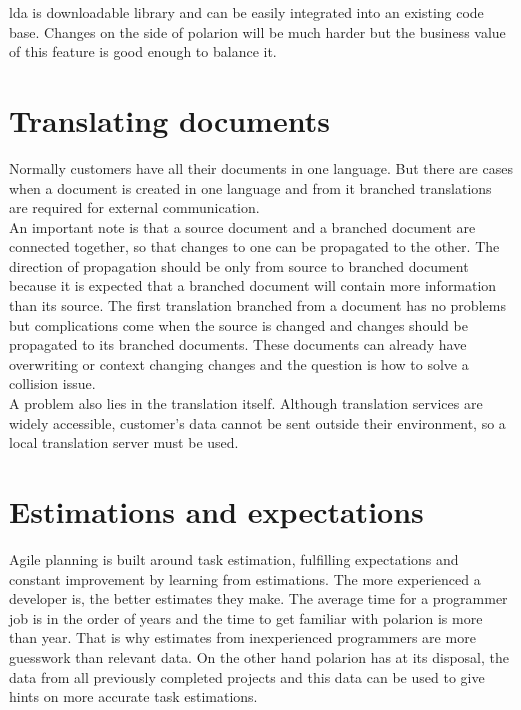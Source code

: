 \documentclass[thesis=M,english]{FITthesis}[2012/06/26]
\begin{document}
\acrshort{lda} is downloadable library and can be easily integrated into an existing code base. Changes on the side of \acrshort{polarion} will be much harder but the business value of this feature is good enough to balance it.

\section{Translating documents}

Normally customers have all their documents in one language. But there are cases when a document is created in one language and from it branched translations are required for external communication.\\

An important note is that a source document and a branched document are connected together, so that changes to one can be propagated to the other. The direction of propagation should be only from source to branched document because it is expected that a branched document will contain more information than its source. The first translation branched from a document has no problems but complications come when the source is changed and changes should be propagated to its branched documents. These documents can already have overwriting or context changing changes and the question is how to solve a collision issue. \\

A problem also lies in the translation itself. Although translation services are widely accessible, customer's data cannot be sent outside their environment, so a local translation server must be used.

\section{Estimations and expectations}

Agile planning is built around task estimation, fulfilling expectations and constant improvement by learning from estimations. The more experienced a developer is, the better estimates they make. The average time for a programmer job is in the order of years and the time to get familiar with \acrshort{polarion} is more than year. That is why estimates from inexperienced programmers are more guesswork  than relevant data. On the other hand \acrshort{polarion} has at its disposal, the data from all previously completed projects and this data can be used to give hints on more accurate task estimations.\\ 
\end{document}
